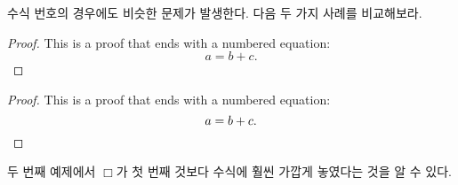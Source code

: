 수식 번호의 경우에도 비슷한 문제가 발생한다. 다음 두 가지 사례를 비교해보라.
\begin{example}
\begin{proof}
  This is a proof that ends
  with a numbered equation:
  \begin{equation}
    a = b + c.
  \end{equation}
\end{proof}
\end{example}

\vspace{-.5\onelineskip}

\begin{example}
\begin{proof}
  This is a proof that ends
  with a numbered equation:
  \begin{equation}
    a = b + c. \qedhere
  \end{equation}
\end{proof}
\end{example}

\noindent
두 번째 예제에서 $\Box$가 첫 번째 것보다 수식에 훨씬 가깝게 놓였다는 것을 알 수 있다.

